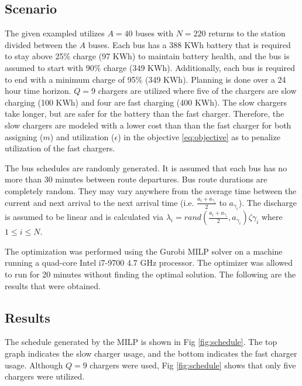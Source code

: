 \documentclass[letterpaper, 10pt, conference]{IEEEtran}
\begin{document}
\subsection{Scenario}
The given exampled utilizes \(A = 40\) buses with \(N = 220\) returns to the station divided between the \(A\) buses. Each bus has a 388 KWh battery that is required to stay above 25\% charge (97 KWh) to maintain battery health, and the bus is assumed to start with 90\% charge (349 KWh). Additionally, each bus is required to end with a minimum charge of 95\% (349 KWh). Planning is done over a 24 hour time horizon. \(Q = 9\) chargers are utilized where five of the chargers are slow charging (100 KWh) and four are fast charging (400 KWh). The slow chargers take longer, but are safer for the battery than the fast charger. Therefore, the slow chargers are modeled with a lower cost than than the fast charger for both assigning (\(m\)) and utilization (\(\epsilon\)) in the objective \eqref{eq:objective} as to penalize utilization of the fast chargers.

The bus schedules are randomly generated. It is assumed that each bus has no more than 30 minutes between route departures. Bus route durations are completely random. They may vary anywhere from the average time between the current and next arrival to the next arrival time (i.e. \(\frac{a_i + a_{\gamma_i}}{2}\) to \(a_{\gamma_i}\)). The discharge is assumed to be linear and is calculated via \(\lambda_i = rand(\frac{a_i + a_{\gamma_i}}{2},a_{\gamma_i})\zeta{\gamma_i}\) where \(1 \leq i \leq N\).

The optimization was performed using the Gurobi MILP solver \cite{Hespanha2018} on a machine running a quad-core Intel i7-9700 4.7 GHz processor. The optimizer was allowed to run for 20 minutes without finding the optimal solution. The following are the results that were obtained.

\subsection{Results}
The schedule generated by the MILP is shown in Fig \ref{fig:schedule}. The top graph indicates the slow charger usage, and the bottom indicates the fast charger usage. Although \(Q = 9\) chargers were used, Fig \ref{fig:schedule} shows that only five chargers were utilized. %
\end{document}
